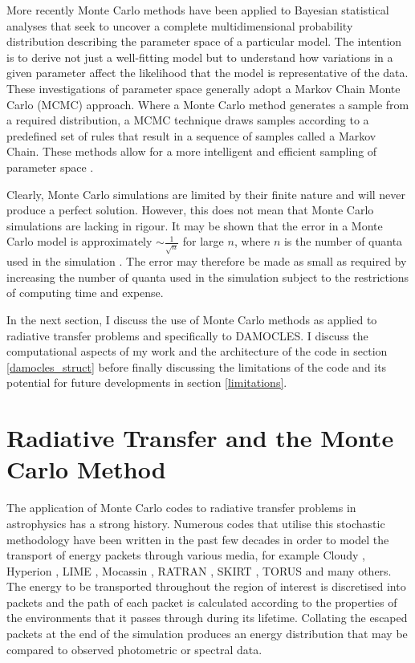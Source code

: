 More recently Monte Carlo methods have been applied to Bayesian statistical analyses that seek to uncover a complete multidimensional probability distribution describing the parameter space of a particular model.  The intention is to derive not just a well-fitting model but to understand how variations in a given parameter affect the likelihood that the model is representative of the data.  These investigations of parameter space generally adopt a Markov Chain Monte Carlo (MCMC) approach.  Where a Monte Carlo method generates a sample from a required distribution, a MCMC technique draws samples according to a predefined set of rules that result in a sequence of samples called a Markov Chain.  These methods allow for a more intelligent and efficient sampling of parameter space \citep{Metropolis1953, Hastings1970, Gilks1996}.  

Clearly, Monte Carlo simulations are limited by their finite nature and will never produce a perfect solution.  However, this does not mean that Monte Carlo simulations are lacking in rigour.  It may be shown that the error in a Monte Carlo model is approximately $\sim \frac{1}{\sqrt{n}}$ for large $n$, where $n$ is the number of quanta used in the simulation \citep{Press2007}.  The error may therefore be made as small as required by increasing the number of quanta used in the simulation subject to the restrictions of computing time and expense.

In the next section, I discuss the use of Monte Carlo methods as applied to radiative transfer problems and specifically to DAMOCLES.  I discuss the computational aspects of my work and the architecture of the code in section \ref{damocles_struct} before finally discussing the limitations of the code and its potential for future developments in section \ref{limitations}.

\section{Radiative Transfer and the Monte Carlo Method}
\label{rt}

The application of Monte Carlo codes to radiative transfer problems in astrophysics has a strong history.  Numerous codes that utilise this stochastic methodology have been written in the past few decades in order to model the transport of energy packets through various media, for example Cloudy \citep{Ferland2013}, Hyperion \citep{Robitaille2011}, LIME \citep{Brinch2010}, Mocassin \citep{Ercolano2003, Ercolano2005}, RATRAN \citep{Hogerheijde2000}, SKIRT \citep{Baes2003}, TORUS \citep{Harries2000} and many others.  The energy to be transported throughout the region of interest is discretised into packets and the path of each packet is calculated according to the properties of the environments that it passes through during its lifetime.  Collating the escaped packets at the end of the simulation produces an energy distribution that may be compared to observed photometric or spectral data. 

